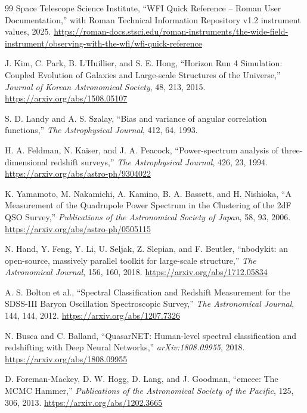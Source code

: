 \begin{thebibliography}{99}
Space Telescope Science Institute,
``WFI Quick Reference -- Roman User Documentation,''
with Roman Technical Information Repository v1.2 instrument values, 2025.
\url{https://roman-docs.stsci.edu/roman-instruments/the-wide-field-instrument/observing-with-the-wfi/wfi-quick-reference}

J. Kim, C. Park, B. L'Huillier, and S. E. Hong,
``Horizon Run 4 Simulation: Coupled Evolution of Galaxies and Large-scale Structures of the Universe,''
\emph{Journal of Korean Astronomical Society}, 48, 213, 2015.
\url{https://arxiv.org/abs/1508.05107}

S. D. Landy and A. S. Szalay,
``Bias and variance of angular correlation functions,''
\emph{The Astrophysical Journal}, 412, 64, 1993.

H. A. Feldman, N. Kaiser, and J. A. Peacock,
``Power-spectrum analysis of three-dimensional redshift surveys,''
\emph{The Astrophysical Journal}, 426, 23, 1994.
\url{https://arxiv.org/abs/astro-ph/9304022}

K. Yamamoto, M. Nakamichi, A. Kamino, B. A. Bassett, and H. Nishioka,
``A Measurement of the Quadrupole Power Spectrum in the Clustering of the 2dF QSO Survey,''
\emph{Publications of the Astronomical Society of Japan}, 58, 93, 2006.
\url{https://arxiv.org/abs/astro-ph/0505115}

N. Hand, Y. Feng, Y. Li, U. Seljak, Z. Slepian, and F. Beutler,
``nbodykit: an open-source, massively parallel toolkit for large-scale structure,''
\emph{The Astronomical Journal}, 156, 160, 2018.
\url{https://arxiv.org/abs/1712.05834}

A. S. Bolton et al.,
``Spectral Classification and Redshift Measurement for the SDSS-III Baryon Oscillation Spectroscopic Survey,''
\emph{The Astronomical Journal}, 144, 144, 2012.
\url{https://arxiv.org/abs/1207.7326}

N. Busca and C. Balland,
``QuasarNET: Human-level spectral classification and redshifting with Deep Neural Networks,''
\emph{arXiv:1808.09955}, 2018.
\url{https://arxiv.org/abs/1808.09955}

D. Foreman-Mackey, D. W. Hogg, D. Lang, and J. Goodman,
``emcee: The MCMC Hammer,''
\emph{Publications of the Astronomical Society of the Pacific}, 125, 306, 2013.
\url{https://arxiv.org/abs/1202.3665}


\end{thebibliography}
